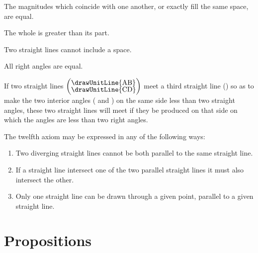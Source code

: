 \startaxiom{}\label{ax:I.VIII}
The magnitudes which coincide with one another, or exactly fill the same space, are equal.


\startaxiom{}\label{ax:I.IX}
The whole is greater than its part.


\startaxiom{}\label{ax:I.X}
Two straight lines cannot include a space.


\startaxiom{}\label{ax:I.XI}
All right angles are equal.


\startaxiom{}\label{ax:I.XII}
\drawCurrentPictureInMargin[inside]
If two straight lines $\left(\vcenter{\nointerlineskip\hbox{\drawUnitLine{AB}}\nointerlineskip\hbox{\drawUnitLine{CD}}}\right)$ meet a third straight line () so as to make the two interior angles ( and ) on the same side less than two straight angles, these two straight lines will meet if they be produced on that side on which the angles are less than two right angles.


The twelfth axiom may be expressed in any of the following ways:
\begin{enumerate}
\item Two diverging straight lines cannot be both parallel to the same straight line.
\item If a straight line intersect one of the two parallel straight lines it must also intersect the other.
\item Only one straight line can be drawn through a given point, parallel to a given straight line.
\end{enumerate}

\chapter*{Propositions}

\label{prop:I.I}

